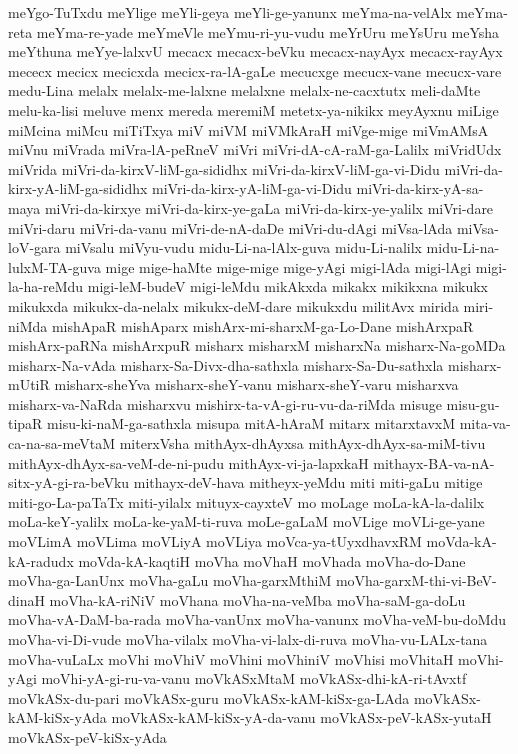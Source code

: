 {meYgo-TuTxdu
meYlige
meYli-geya
meYli-ge-yanunx
meYma-na-velAlx
meYma-reta
meYma-re-yade
meYmeVle
meYmu-ri-yu-vudu
meYrUru
meYsUru
meYsha
meYthuna
meYye-lalxvU
mecacx
mecacx-beVku
mecacx-nayAyx
mecacx-rayAyx
mececx
mecicx
mecicxda
mecicx-ra-lA-gaLe
mecucxge
mecucx-vane
mecucx-vare
medu-Lina
melalx
melalx-me-lalxne
melalxne
melalx-ne-cacxtutx
meli-daMte
melu-ka-lisi
meluve
menx
mereda
meremiM
metetx-ya-nikikx
meyAyxnu
miLige
miMcina
miMcu
miTiTxya
miV
miVM
miVMkAraH
miVge-mige
miVmAMsA
miVnu
miVrada
miVra-lA-peRneV
miVri
miVri-dA-cA-raM-ga-Lalilx
miVridUdx
miVrida
miVri-da-kirxV-liM-ga-sididhx
miVri-da-kirxV-liM-ga-vi-Didu
miVri-da-kirx-yA-liM-ga-sididhx
miVri-da-kirx-yA-liM-ga-vi-Didu
miVri-da-kirx-yA-sa-maya
miVri-da-kirxye
miVri-da-kirx-ye-gaLa
miVri-da-kirx-ye-yalilx
miVri-dare
miVri-daru
miVri-da-vanu
miVri-de-nA-daDe
miVri-du-dAgi
miVsa-lAda
miVsa-loV-gara
miVsalu
miVyu-vudu
midu-Li-na-lAlx-guva
midu-Li-nalilx
midu-Li-na-lulxM-TA-guva
mige
mige-haMte
mige-mige
mige-yAgi
migi-lAda
migi-lAgi
migi-la-ha-reMdu
migi-leM-budeV
migi-leMdu
mikAkxda
mikakx
mikikxna
mikukx
mikukxda
mikukx-da-nelalx
mikukx-deM-dare
mikukxdu
militAvx
mirida
miri-niMda
mishApaR
mishAparx
mishArx-mi-sharxM-ga-Lo-Dane
mishArxpaR
mishArx-paRNa
mishArxpuR
misharx
misharxM
misharxNa
misharx-Na-goMDa
misharx-Na-vAda
misharx-Sa-Divx-dha-sathxla
misharx-Sa-Du-sathxla
misharx-mUtiR
misharx-sheYva
misharx-sheY-vanu
misharx-sheY-varu
misharxva
misharx-va-NaRda
misharxvu
mishirx-ta-vA-gi-ru-vu-da-riMda
misuge
misu-gu-tipaR
misu-ki-naM-ga-sathxla
misupa
mitA-hAraM
mitarx
mitarxtavxM
mita-va-ca-na-sa-meVtaM
miterxVsha
mithAyx-dhAyxsa
mithAyx-dhAyx-sa-miM-tivu
mithAyx-dhAyx-sa-veM-de-ni-pudu
mithAyx-vi-ja-lapxkaH
mithayx-BA-va-nA-sitx-yA-gi-ra-beVku
mithayx-deV-hava
mitheyx-yeMdu
miti
miti-gaLu
mitige
miti-go-La-paTaTx
miti-yilalx
mituyx-cayxteV
mo
moLage
moLa-kA-la-dalilx
moLa-keY-yalilx
moLa-ke-yaM-ti-ruva
moLe-gaLaM
moVLige
moVLi-ge-yane
moVLimA
moVLima
moVLiyA
moVLiya
moVca-ya-tUyxdhavxRM
moVda-kA-kA-radudx
moVda-kA-kaqtiH
moVha
moVhaH
moVhada
moVha-do-Dane
moVha-ga-LanUnx
moVha-gaLu
moVha-garxMthiM
moVha-garxM-thi-vi-BeV-dinaH
moVha-kA-riNiV
moVhana
moVha-na-veMba
moVha-saM-ga-doLu
moVha-vA-DaM-ba-rada
moVha-vanUnx
moVha-vanunx
moVha-veM-bu-doMdu
moVha-vi-Di-vude
moVha-vilalx
moVha-vi-lalx-di-ruva
moVha-vu-LALx-tana
moVha-vuLaLx
moVhi
moVhiV
moVhini
moVhiniV
moVhisi
moVhitaH
moVhi-yAgi
moVhi-yA-gi-ru-va-vanu
moVkASxMtaM
moVkASx-dhi-kA-ri-tAvxtf
moVkASx-du-pari
moVkASx-guru
moVkASx-kAM-kiSx-ga-LAda
moVkASx-kAM-kiSx-yAda
moVkASx-kAM-kiSx-yA-da-vanu
moVkASx-peV-kASx-yutaH
moVkASx-peV-kiSx-yAda
}
